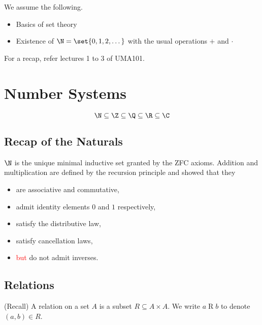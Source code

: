 
We assume the following.
\begin{itemize}
    \item Basics of set theory
    \item Existence of $\N = \set{0, 1, 2, \dots}$ with the usual operations
    $+$ and $\cdot$
\end{itemize}
For a recap, refer lectures 1 to 3 of UMA101.

\section{Number Systems} \label{sec:number_systems}
\[
    \N \subseteq \Z \subseteq \Q \subseteq \R \subseteq \C
\]
\subsection{Recap of the Naturals} \label{sec:naturals}
$\N$ is the unique minimal inductive set granted by the ZFC axioms.
Addition and multiplication are defined by the recursion principle and showed
that they
\begin{itemize}
    \item are associative and commutative,
    \item admit identity elements $0$ and $1$ respectively,
    \item satisfy the distributive law,
    \item satisfy cancellation laws,
    \item \textcolor{Red}{but} do not admit inverses.
\end{itemize}

\subsection{Relations} \label{sec:relations}
(Recall) A relation on a set $A$ is a subset $R \subseteq A \times A$.
We write $a \mathrel{R} b$ to denote $(a, b) \in R$.

